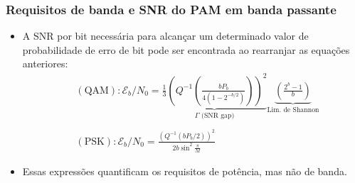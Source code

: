 \begin{frame}[t,fragile]
\begin{figure}
     \end{figure}
\end{frame}

\begin{frame}
	\frametitle{Requisitos de banda e SNR do PAM em banda passante}

	\begin{itemize}
	    \item A SNR por bit necessária para alcançar um determinado valor de probabilidade de erro de bit pode ser encontrada ao rearranjar as equações anteriores:
	    \begin{align*}
		&(\text{QAM}): \mathcal{E}_b/N_0 = \underbrace{\frac{1}{3}\left(Q^{-1}\left( \frac{bP_b}{4(1-2^{-b/2})} \right) \right)^2}_{\Gamma \text{ (SNR gap)}} \underbrace{\left(\frac{2^b-1}{b}\right)}_{\text{Lim. de Shannon}}  \\ \\
		&(\text{PSK}): \mathcal{E}_b/N_0 = \frac{(Q^{-1}(bP_b/2))^2}{2b\sin^2\frac{\pi}{M}}
	    \end{align*}
	    \item Essas expressões quantificam os requisitos de potência, mas não de banda.
	\end{itemize}	
\end{frame}


